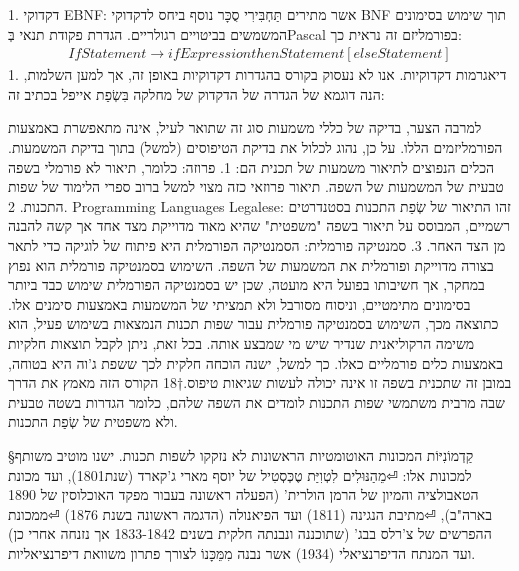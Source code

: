 \begin{טבלא}[!htbp]
      1. דקדוקי EBNF: אשר מתירים תַּחְבִּירִי סֻכָּר נוסף ביחס לדקדוקי BNF תוך שימוש בסימונים המשמשים בביטויים רגולריים. הגדרת פקודת תנאי בְּPascal בפורמליזם זה נראית כך:
      \begin{align}
      IfStatement→if Expression then Statement [else Statement]
    \end{align}
      1. דיאגרמות דקדוקיות. אנו לא נעסוק בקורס בהגדרות דקדוקיות באופן זה, אך למען השלמות, הנה דוגמא של הגדרה של הדקדוק של מחלקה בִּשְׂפַת אייפל בכתיב זה:

      למרבה הצער, בדיקה של כללי משמעות סוג זה שתואר לעיל, אינה מתאפשרת באמצעות
      הפורמליזמים הללו. על כן, נהוג לכלול את בדיקת הטיפוסים (למשל) בתוך בדיקת
      המשמעות. הכלים הנפוצים לתיאור משמעות של תכנית הם:
      1. פרוזה: כלומר, תיאור לא פורמלי בשפה טבעית של המשמעות של השפה. תיאור פרוזאי כזה מצוי למשל ברוב ספרי הלימוד של שפות התכנות.
      2. Programming Languages Legalese: זהו התיאור של שְׂפַת התכנות בסטנדרטים רשמיים, המבוסס על תיאור בשפה "משפטית" שהיא מאוד מדוייקת מצד אחד אך קשה להבנה מן הצד האחר.
      3. סמנטיקה פורמלית: הסמנטיקה הפורמלית היא פיתוח של לוגיקה כדי לתאר בצורה מדוייקת ופורמלית את המשמעות של השפה.
      השימוש בסמנטיקה פורמלית הוא נפוץ במחקר, אך חשיבותו בפועל היא מועטה, שכן יש בסמנטיקה הפורמלית שימוש כבד ביותר בסימונים מתימטיים, וניסוח מסורבל ולא תמציתי של המשמעות באמצעות סימנים אלו. כתוצאה מכך, השימוש בסמנטיקה פורמלית עבור שפות תכנות הנמצאות בשימוש פעיל, הוא משימה הרקוליאנית שנדיר שיש מי שמבצע אותה.
      בכל זאת, ניתן לקבל תוצאות חלקיות באמצעות כלים פורמליים כאלו. כך למשל, ישנה הוכחה חלקית לכך ששפת ג'וה היא בטוחה, במובן זה שתכנית בשפה זו אינה יכולה לעשות שגיאות טיפוס.†{18}
      הקורס הזה מאמץ את הדרך שבה מרבית משתמשי שפות התכנות לומדים את השפה שלהם, כלומר
      הגדרות בשטה טבעית ולא משפטית של שְׂפַת התכנות.

     §קַדְמוֹנִיּוֹת
     המכונות האוטומטיות הראשונות לא נזקקו לשפות תכנות. ישנו מוטיב משותף למכונות אלו:
⏎מֵהַנּוּלִים לִטְוִיַּת טֶכְּסְטִיל של יוסף מארי ג'קארד (שנת1801), ועד מכונת הטאבולציה והמיון של הרמן הולרית' (הפעלה ראשונה בעבור מפקד האוכלוסין של 1890 בארה"ב),
⏎מתיבת הנגינה (1811) ועד הפיאנולה (הדגמה ראשונה בשנת 1876)
⏎ממכונת ההפרשים של צ'רלס בבג' (שתוכננה ונבנתה חלקית בשנים 1833-1842 אך נזנחה אחרי כן) ועד המנתח הדיפרנציאלי (1934) אשר נבנה מִמֵּכָּנוֹ לצורך פתרון משוואת דיפרנציאליות.


\end{טבלא}
